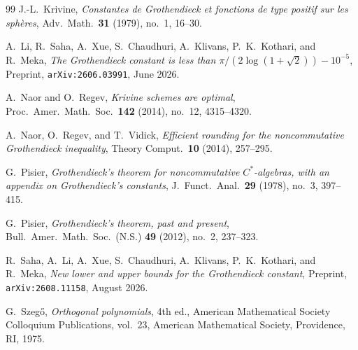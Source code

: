 \documentclass[11pt,reqno]{amsart}
\theoremstyle{definition}
\numberwithin{equation}{section}
\begin{document}
\begin{thebibliography}{99}
J.-L.~Krivine,
\emph{Constantes de Grothendieck et fonctions de type positif sur les sph\`eres},
Adv.\ Math.\ \textbf{31} (1979), no.~1, 16--30.

A.~Li, R.~Saha, A.~Xue, S.~Chaudhuri, A.~Klivans, P.~K.~Kothari, and R.~Meka,
\emph{The Grothendieck constant is less than $\pi/(2\log(1+\sqrt{2}))-10^{-5}$},
Preprint, \texttt{arXiv:2606.03991}, June 2026.

A.~Naor and O.~Regev,
\emph{Krivine schemes are optimal},
Proc.\ Amer.\ Math.\ Soc.\ \textbf{142} (2014), no.~12, 4315--4320.

A.~Naor, O.~Regev, and T.~Vidick,
\emph{Efficient rounding for the noncommutative Grothendieck inequality},
Theory Comput.\ \textbf{10} (2014), 257--295.

G.~Pisier,
\emph{Grothendieck's theorem for noncommutative $C^*$-algebras, with an appendix on Grothendieck's constants},
J.\ Funct.\ Anal.\ \textbf{29} (1978), no.~3, 397--415.

G.~Pisier,
\emph{Grothendieck's theorem, past and present},
Bull.\ Amer.\ Math.\ Soc.\ (N.S.) \textbf{49} (2012), no.~2, 237--323.

R.~Saha, A.~Li, A.~Xue, S.~Chaudhuri, A.~Klivans, P.~K.~Kothari, and R.~Meka,
\emph{New lower and upper bounds for the Grothendieck constant},
Preprint, \texttt{arXiv:2608.11158}, August 2026.

G.~Szeg\H{o},
\emph{Orthogonal polynomials}, 4th ed.,
American Mathematical Society Colloquium Publications, vol.~23, American Mathematical Society, Providence, RI, 1975.

\end{thebibliography}
\end{document}
